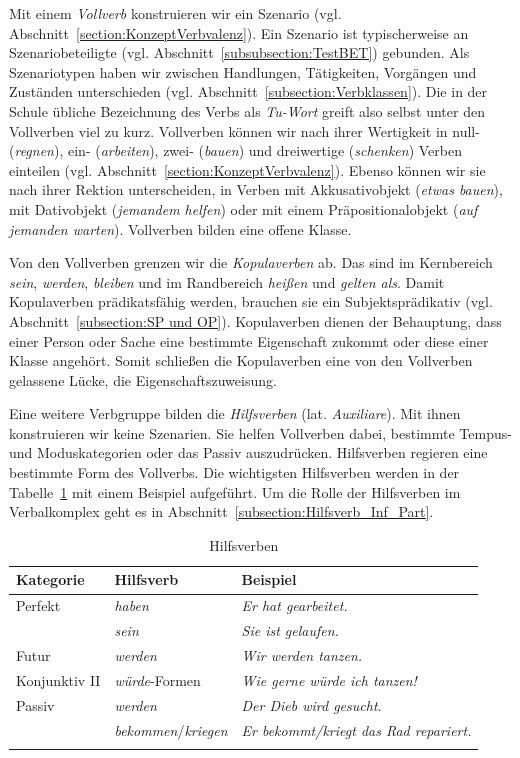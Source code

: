 Mit einem \textit{Vollverb} konstruieren wir ein Szenario (vgl. Abschnitt~\ref{section:KonzeptVerbvalenz}). Ein Szenario ist typischerweise an Szenariobeteiligte (vgl. Abschnitt~\ref{subsubsection:TestBET}) gebunden. Als Szenariotypen haben wir zwischen Handlungen, Tätigkeiten, Vorgängen und Zuständen unterschieden (vgl. Abschnitt~\ref{subsection:Verbklassen}). Die in der Schule übliche Bezeichnung des Verbs als \textit{Tu-Wort} greift also selbst unter den Vollverben viel zu kurz. Vollverben können wir nach ihrer Wertigkeit in null- (\textit{regnen}), ein- (\textit{arbeiten}), zwei- (\textit{bauen}) und dreiwertige (\textit{schenken}) Verben einteilen (vgl. Abschnitt~\ref{section:KonzeptVerbvalenz}). Ebenso können wir sie nach ihrer Rektion unterscheiden, \zB in Verben mit Akkusativobjekt (\textit{etwas bauen}), mit Dativobjekt (\textit{jemandem helfen}) oder mit einem Präpositionalobjekt (\textit{auf jemanden warten}). Vollverben bilden eine offene Klasse.

Von den Vollverben grenzen wir die \textit{Kopulaverben} ab. Das sind im Kernbereich \textit{sein}, \textit{werden}, \textit{bleiben} und im Randbereich \textit{heißen} und \textit{gelten als}. Damit Kopulaverben prädikatsfähig werden, brauchen sie ein Subjektsprädikativ (vgl. Abschnitt~\ref{subsection:SP und OP}). Kopulaverben dienen der Behauptung, dass einer Person oder Sache eine bestimmte Eigenschaft zukommt oder diese einer Klasse angehört. Somit schließen die Kopulaverben eine von den Vollverben gelassene Lücke, die Eigenschaftszuweisung. 

Eine weitere Verbgruppe bilden die \textit{Hilfsverben} (lat. \textit{Auxiliare}). Mit ihnen konstruieren wir keine Szenarien. Sie helfen Vollverben dabei, bestimmte Tempus- und Moduskategorien oder das Passiv auszudrücken. Hilfsverben regieren eine bestimmte Form des Vollverbs. Die wichtigsten Hilfsverben werden in der Tabelle~\ref{tab:Hilfsverben} mit einem Beispiel aufgeführt. Um die Rolle der Hilfsverben im Verbalkomplex geht es in Abschnitt~\ref{subsection:Hilfsverb_Inf_Part}.

\begin{table}
  \centering
  \begin{tabularx}{\textwidth}{XXl}
    \lsptoprule
    Kategorie & Hilfsverb & Beispiel \\
    \hline
    Perfekt & \textit{haben} & \textit{Er hat gearbeitet.}\\
    & \textit{sein} & \textit{Sie ist gelaufen.} \\
    Futur & \textit{werden} & \textit{Wir werden tanzen.}\\
    Konjunktiv II & \textit{würde}-Formen & \textit{Wie gerne würde ich tanzen!} \\ 
    Passiv & \textit{werden} & \textit{Der Dieb wird gesucht.}\\  
    & \textit{bekommen}/\textit{kriegen} & \textit{Er bekommt/kriegt das Rad repariert.}\\ 
    \lspbottomrule 
  \end{tabularx}
  \caption{Hilfsverben}
  \label{tab:Hilfsverben}
\end{table}


